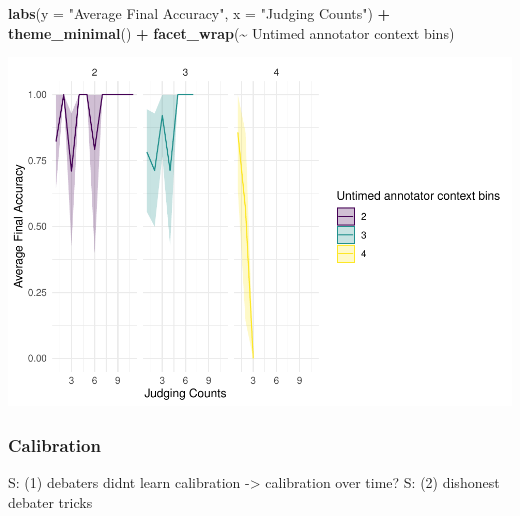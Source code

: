 \documentclass[
]{article}
\newenvironment{Shaded}{\begin{snugshade}}{\end{snugshade}}
\newcommand{\AttributeTok}[1]{\textcolor[rgb]{0.13,0.29,0.53}{#1}}
\newcommand{\FunctionTok}[1]{\textcolor[rgb]{0.13,0.29,0.53}{\textbf{#1}}}
\newcommand{\NormalTok}[1]{#1}
\newcommand{\SpecialCharTok}[1]{\textcolor[rgb]{0.81,0.36,0.00}{\textbf{#1}}}
\newcommand{\StringTok}[1]{\textcolor[rgb]{0.31,0.60,0.02}{#1}}
\begin{document}
\begin{Shaded}
\begin{Highlighting}[]
  \FunctionTok{labs}\NormalTok{(}\AttributeTok{y =} \StringTok{"Average Final Accuracy"}\NormalTok{, }\AttributeTok{x =} \StringTok{"Judging Counts"}\NormalTok{) }\SpecialCharTok{+}
  \FunctionTok{theme\_minimal}\NormalTok{() }\SpecialCharTok{+}
  \FunctionTok{facet\_wrap}\NormalTok{(}\SpecialCharTok{\textasciitilde{}} \StringTok{\textasciigrave{}}\AttributeTok{Untimed annotator context bins}\StringTok{\textasciigrave{}}\NormalTok{)}
\end{Highlighting}
\end{Shaded}

\includegraphics[width=1\linewidth]{debate-2309_files/figure-latex/unnamed-chunk-2-2}

\subsubsection{Calibration}\label{calibration}

S: (1) debaters didnt learn calibration -\textgreater{} calibration over
time? S: (2) dishonest debater tricks
\end{document}
